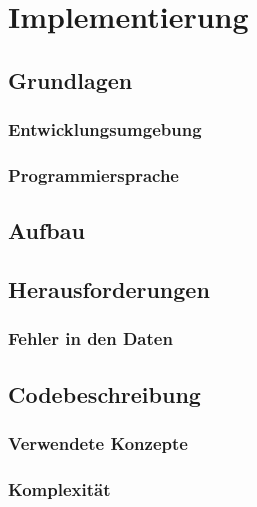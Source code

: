\chapter{Implementierung}
\label{chapter5}


\section{Grundlagen}
\label{5-Grundlagen}


\subsection{Entwicklungsumgebung}
\label{5-Entwicklungsumgebung}

\subsection{Programmiersprache}
\label{5-Programmiersprache}


\section{Aufbau}
\label{5-Aufbau}


\section{Herausforderungen}
\label{5-Herausforderungen}

\subsection{Fehler in den Daten}
\label{5-FehlerDaten}


\section{Codebeschreibung}
\label{5-Codebeschreibung}

\subsection{Verwendete Konzepte}
\label{5-VerwendeteKonzepte}

\subsection{Komplexität}
\label{5-Komplexität}